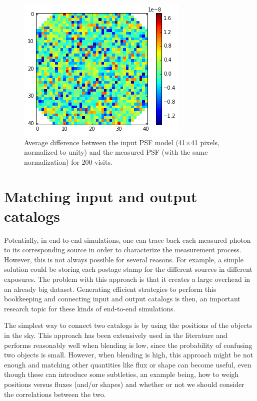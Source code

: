\documentclass[\docopts]{\docclass}
\begin{document}
\begin{figure}
\centering
\includegraphics[width=0.9\columnwidth]{psf_residual.png}
\caption{Average difference between the input PSF model (41$\times$41 pixels, normalized to unity) and the measured PSF (with the same normalization) for 200 visits.}
\label{fig:psf_residual}
\end{figure}

\section{Matching input and output catalogs}
\label{sec:matching}

Potentially, in end-to-end simulations, one can trace back each measured photon to its corresponding source in order to characterize the measurement process. However, this is not always possible for several reasons. For example, a simple solution could be storing each postage stamp for the different sources in different exposures. The problem with this approach is that it creates a large overhead in an already big dataset. Generating efficient strategies to perform this bookkeeping and connecting input and output catalogs is then, an important research topic for these kinds of end-to-end simulations. 

The simplest way to connect two catalogs is by using the positions of the objects in the sky. This approach has been extensively used in the literature and performs reasonably well when blending is low, since the probability of confusing two objects is small. However, when blending is high, this approach might be not enough and matching other quantities like flux or shape can become useful, even though these can introduce some subtleties, an example being, how to weigh positions versus fluxes (and/or shapes) and whether or not we should consider the correlations between the two.
\end{document}
